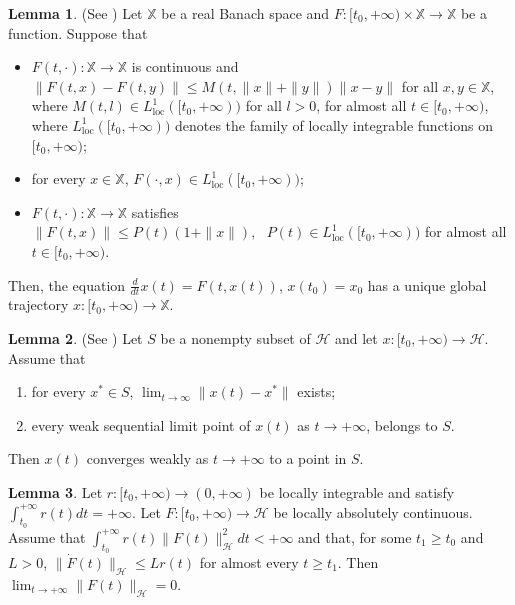 \documentclass{article}
\theoremstyle{definition}
\newtheorem{lemma}{Lemma}[section]
\theoremstyle{definition}
\theoremstyle{definition}
\begin{document}
\begin{lemma}(See \cite[Proposition 6.2.1]{Haraux A1991})
\label{cauchy-lipschitz}
Let $\mathbb{X}$ be a real Banach space and $F: [t_{0}, +\infty) \times \mathbb{X} \to \mathbb{X}$ be a function. Suppose that
\begin{itemize}
\item[{\rm(i)}] $F(t, \cdot): \mathbb{X} \to \mathbb{X}$ is continuous and $\|F(t,x)-F(t,y)\|\leq M(t,\|x\|+\|y\|)\|x-y\|$ for all $x,y\in\mathbb{X}$, where $M(t,l)\in L^{1}_{\mathrm{loc}}([t_{0}, +\infty))$ for all $l>0$, for almost all $t \in [t_{0}, +\infty)$, where $L_{\mathrm{loc}}^1([t_0,+\infty))$ denotes the family of locally integrable functions on $[t_0,+\infty)$;
    \item[{\rm(ii)}] for every $x \in \mathbb{X}$, $F(\cdot, x) \in L^{1}_{\mathrm{loc}}([t_{0}, +\infty))$;
    \item[{\rm(iii)}] $F(t, \cdot): \mathbb{X} \to \mathbb{X}$ satisfies
$\|F(t, x)\| \leq P(t)(1 + \|x\|),\,\,\,\,  P(t) \in L^{1}_{\mathrm{loc}}([t_{0}, +\infty))$ for almost all $t \in [t_{0}, +\infty)$.
\end{itemize}
Then,  the equation $\frac{d}{dt}x(t) = F(t, x(t))$, $x(t_{0}) = x_{0}$ has a unique global trajectory $x: [t_{0}, +\infty) \to \mathbb{X}$.
\end{lemma}

\begin{lemma} (See \cite[Lemma A.2]{Attouch H_2019})
\label{lem:opial}
Let $S$ be a nonempty subset of $\mathcal{H}$ and let $x : [t_0, +\infty) \to \mathcal{H}$. Assume that
\begin{enumerate}
\item[{\rm(i)}] for every $x^* \in S$, $\lim_{t \to \infty} \|x(t) - x^*\|$ exists;
\item[{\rm(ii)}] every weak sequential limit point of $x(t)$ as $t \to +\infty$, belongs to $S$.
\end{enumerate}
Then $x(t)$ converges weakly as $t \to +\infty$ to a point in $S$.
\end{lemma}

\begin{lemma}
\label{lem:weighted_decay_criterion}
Let $r:[t_0,+\infty)\to(0,+\infty)$ be locally integrable and satisfy
$\int_{t_0}^{+\infty}r(t)dt=+\infty$. Let $F:[t_0,+\infty)\to\mathcal{H}$ be locally absolutely continuous. Assume that $\int_{t_0}^{+\infty} r(t)\|F(t)\|_{\mathcal{H}}^2dt<+\infty$ and that, for some $t_1\ge t_0$ and $L>0$, $\|\dot F(t)\|_{\mathcal{H}}\le Lr(t)$ 
for almost every $t\ge t_1$. Then
$\lim_{t\to+\infty}\|F(t)\|_{\mathcal{H}}=0$.
\end{lemma}
\end{document}
